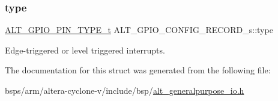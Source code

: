 \subsubsection{\texorpdfstring{type}{type}}
{\footnotesize\ttfamily \mbox{\hyperlink{group__ALT__GPIO__API__CONFIG_gafa3659cf3d59e915a16c591a73258eef}{A\+L\+T\+\_\+\+G\+P\+I\+O\+\_\+\+P\+I\+N\+\_\+\+T\+Y\+P\+E\+\_\+t}} A\+L\+T\+\_\+\+G\+P\+I\+O\+\_\+\+C\+O\+N\+F\+I\+G\+\_\+\+R\+E\+C\+O\+R\+D\+\_\+s\+::type}

Edge-\/triggered or level triggered interrupts. 

The documentation for this struct was generated from the following file\+:\begin{DoxyCompactItemize}
\item 
bsps/arm/altera-\/cyclone-\/v/include/bsp/\mbox{\hyperlink{alt__generalpurpose__io_8h}{alt\+\_\+generalpurpose\+\_\+io.\+h}}\end{DoxyCompactItemize}
